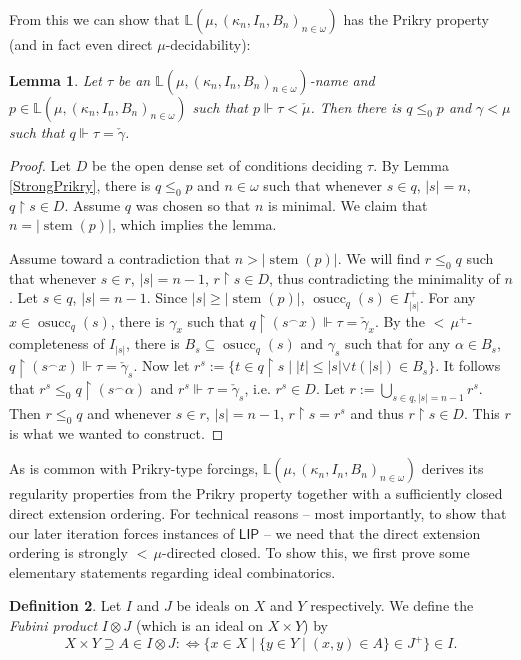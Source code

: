 \documentclass[a4paper]{amsart}
\theoremstyle{definition}
\newtheorem{mydef}{Definition}[section]
\theoremstyle{remark}
\theoremstyle{plain}
\newtheorem{mylem}[mydef]{Lemma}
\numberwithin{mydef}{section}
\DeclareMathOperator{\stem}{stem}
\DeclareMathOperator{\osucc}{osucc}
\newcommand{\dL}{\mathbb{L}}
\newcommand{\uhr}{\upharpoonright}
\newcommand{\LIP}{\mathsf{LIP}}
\begin{document}
	From this we can show that $\dL(\mu,(\kappa_n,I_n,B_n)_{n\in\omega})$ has the Prikry property (and in fact even direct $\mu$-decidability):
	
	\begin{mylem}\label{LDirectDecide}
		Let $\tau$ be an $\dL(\mu,(\kappa_n,I_n,B_n)_{n\in\omega})$-name and $p\in\dL(\mu,(\kappa_n,I_n,B_n)_{n\in\omega})$ such that $p\Vdash\tau<\check{\mu}$. Then there is $q\leq_0p$ and $\gamma<\mu$ such that $q\Vdash\tau=\check{\gamma}$.
	\end{mylem}
	
	\begin{proof}
		Let $D$ be the open dense set of conditions deciding $\tau$. By Lemma \ref{StrongPrikry}, there is $q\leq_0p$ and $n\in\omega$ such that whenever $s\in q$, $|s|=n$, $q\uhr s\in D$. Assume $q$ was chosen so that $n$ is minimal. We claim that $n=|\stem(p)|$, which implies the lemma.
		
		Assume toward a contradiction that $n>|\stem(p)|$. We will find $r\leq_0q$ such that whenever $s\in r$, $|s|=n-1$, $r\uhr s\in D$, thus contradicting the minimality of $n$. Let $s\in q$, $|s|=n-1$. Since $|s|\geq|\stem(p)|$, $\osucc_q(s)\in I_{|s|}^+$. For any $x\in\osucc_q(s)$, there is $\gamma_x$ such that $q\uhr(s^{\frown}x)\Vdash\tau=\check{\gamma}_x$. By the ${<}\,\mu^+$-completeness of $I_{|s|}$, there is $B_s\subseteq\osucc_q(s)$ and $\gamma_s$ such that for any $\alpha\in B_s$, $q\uhr(s^{\frown}x)\Vdash\tau=\check{\gamma}_s$. Now let $r^s:=\{t\in q\uhr s\;|\;|t|\leq|s|\vee t(|s|)\in B_s\}$. It follows that $r^s\leq_0 q\uhr(s^{\frown}\alpha)$ and $r^s\Vdash\tau=\check{\gamma}_s$, i.e. $r^s\in D$. Let $r:=\bigcup_{s\in q,|s|=n-1}r^s$. Then $r\leq_0q$ and whenever $s\in r$, $|s|=n-1$, $r\uhr s=r^s$ and thus $r\uhr s\in D$. This $r$ is what we wanted to construct.
	\end{proof}
	
	As is common with Prikry-type forcings, $\dL(\mu,(\kappa_n,I_n,B_n)_{n\in\omega})$ derives its regularity properties from the Prikry property together with a sufficiently closed direct extension ordering. For technical reasons -- most importantly, to show that our later iteration forces instances of $\LIP$ -- we need that the direct extension ordering is strongly ${<}\,\mu$-directed closed. To show this, we first prove some elementary statements regarding ideal combinatorics.
	
	\begin{mydef}
		Let $I$ and $J$ be ideals on $X$ and $Y$ respectively. We define the \emph{Fubini product} $I\otimes J$ (which is an ideal on $X\times Y$) by
		$$X\times Y\supseteq A\in I\otimes J:\Leftrightarrow\{x\in X\;|\;\{y\in Y\;|\;(x,y)\in A\}\in J^+\}\in I.$$
	\end{mydef}
	
\end{document}
